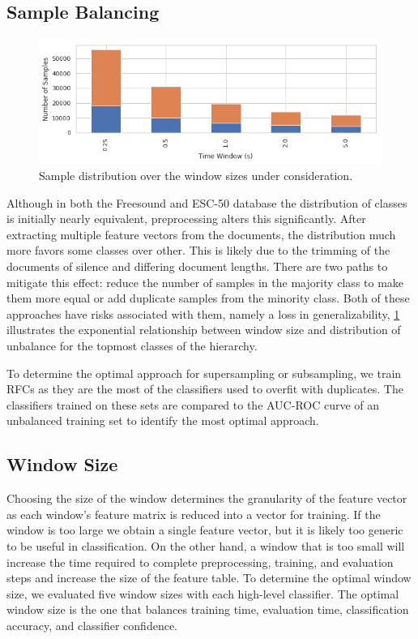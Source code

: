 \subsection{Sample Balancing}
\begin{figure}[h]
    \centering
    \includegraphics[width=.45\textwidth]{figures/Sample-Distribution.png}
    \caption{Sample distribution over the window sizes under consideration.}
    \label{fig:sample-distribution}
\end{figure}
Although in both the Freesound and ESC-50 database the distribution of classes is initially nearly equivalent, preprocessing alters this significantly. After extracting multiple feature vectors from the documents, the distribution much more favors some classes over other. This is likely due to the trimming of the documents of silence and differing document lengths. There are two paths to mitigate this effect: reduce the number of samples in the majority class to make them more equal or add duplicate samples from the minority class. Both of these approaches have risks associated with them, namely a loss in generalizability, \cref{fig:sample-distribution} illustrates the exponential relationship between window size and distribution of unbalance for the topmost classes of the hierarchy.

To determine the optimal approach for supersampling or subsampling, we train RFCs as they are the most of the classifiers used to overfit with duplicates. The classifiers trained on these sets are compared to the AUC-ROC curve of an unbalanced training set to identify the most optimal approach.

\subsection{Window Size}

Choosing the size of the window determines the granularity of the feature vector as each window's feature matrix is reduced into a vector for training. If the window is too large we obtain a single feature vector, but it is likely too generic to be useful in classification. On the other hand, a window that is too small will increase the time required to complete preprocessing, training, and evaluation steps and increase the size of the feature table. To determine the optimal window size, we evaluated five window sizes with each high-level classifier. The optimal window size is the one that balances training time, evaluation time, classification accuracy, and classifier confidence.

